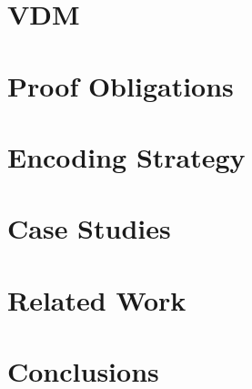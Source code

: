 \documentclass[sigconf]{acmart}
\begin{document}



% 

\section{VDM}
\label{section:vdm}



\section{Proof Obligations}
\label{section:proof-obligations}



\section{Encoding Strategy}
\label{section:encode-strategy}



\section{Case Studies}
\label{section:case-studies}



\section{Related Work}
\label{section:related-work}



\section{Conclusions}
\label{section:conclusions}





\end{document}
